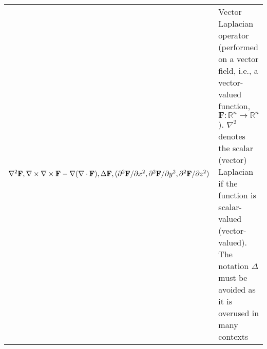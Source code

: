 \begin{xltabular}{\textwidth}{XX}
	\(\nabla^2 \mathbf{F}, \nabla \times \nabla \times \mathbf{F} - \nabla(\nabla \cdot \mathbf{F}), \Delta \mathbf{F}, \newline (\partial^2\mathbf{F}/\partial x^2 , \partial^2\mathbf{F}/\partial y^2 , \partial^2\mathbf{F}/\partial z^2)\)                                                         & Vector Laplacian operator (performed on a vector field, i.e., a vector-valued function, \(\mathbf{F}: \mathbb{R}^{n} \rightarrow \mathbb{R}^{n}\)). \(\nabla^2\) denotes the scalar (vector) Laplacian if the function is scalar-valued (vector-valued). The notation \(\Delta\) must be avoided as it is overused in many contexts \\
\end{xltabular}
